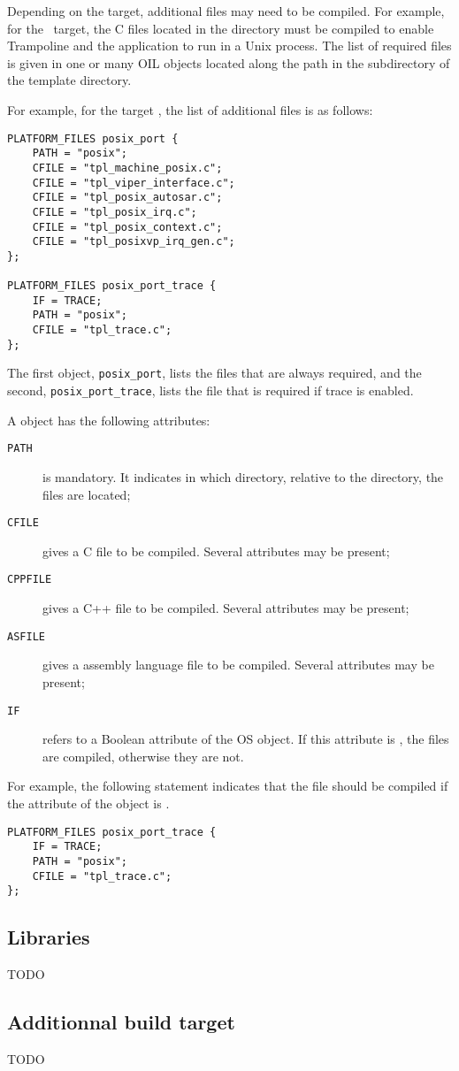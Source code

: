Depending on the target, additional files may need to be compiled. For example, for the \posix\ target, the C files located in the  directory must be compiled to enable Trampoline and the application to run in a Unix process. The list of required files is given in one or many OIL objects located along the path in the  subdirectory of the template directory.

For example, for the target \posix, the list of additional files is as follows:

\begin{lstlisting}[language=OIL]
PLATFORM_FILES posix_port {
    PATH = "posix";
    CFILE = "tpl_machine_posix.c";
    CFILE = "tpl_viper_interface.c";
    CFILE = "tpl_posix_autosar.c";
    CFILE = "tpl_posix_irq.c";
    CFILE = "tpl_posix_context.c";
    CFILE = "tpl_posixvp_irq_gen.c";
};

PLATFORM_FILES posix_port_trace {
    IF = TRACE;
    PATH = "posix";
    CFILE = "tpl_trace.c";
};
\end{lstlisting}

The first object, \lstinline{posix_port}, lists the files that are always required, and the second, \lstinline{posix_port_trace}, lists the file  that is required if trace is enabled.

A  object has the following attributes:

\begin{description}
\item[\texttt{PATH}] is mandatory. It indicates in which directory, relative to the  directory, the files are located;
\item[\texttt{CFILE}] gives a C file to be compiled. Several  attributes may be present;
\item[\texttt{CPPFILE}] gives a C++ file to be compiled. Several  attributes may be present;
\item[\texttt{ASFILE}] gives a assembly language file to be compiled. Several  attributes may be present;
\item[\texttt{IF}] refers to a Boolean attribute of the OS object. If this attribute is , the files are compiled, otherwise they are not.
\end{description}

For example, the following statement indicates that the file  should be compiled if the  attribute of the  object is .

\begin{lstlisting}[language=OIL]
PLATFORM_FILES posix_port_trace {
    IF = TRACE;
    PATH = "posix";
    CFILE = "tpl_trace.c";
};
\end{lstlisting}


\subsection{Libraries}
TODO

\subsection{Additionnal build target}
\label{sec:additionnalTarget}
TODO
